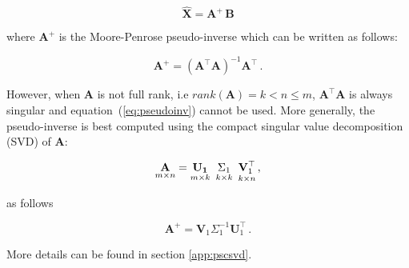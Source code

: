 \begin{equation}
\label{eq:MP}
\hat{\mathbf{X}}=\mathbf{A}^{\!\!+}\,\mathbf{B}
\end{equation}

\noindent where $\mathbf{A}^{\!\!+}$ is the Moore-Penrose pseudo-inverse
which can be written as follows: 

\begin{equation}
\label{eq:pseudoinv}
\mathbf{A}^{\!\!+}= (\mathbf{A}^{\!\!\top} \mathbf{A})^{-1}\mathbf{A}^{\!\!\top} \, .
\end{equation}

However, when $\mathbf{A}$ is not full rank, i.e
$rank(\mathbf{A})=k <  n \leq m$, $\mathbf{A}^\top \mathbf{A}$ is
always singular and equation~(\ref{eq:pseudoinv}) cannot be used.
More generally, the pseudo-inverse is best computed using the compact
singular value decomposition (SVD) of $\mathbf{A}$:

\begin{equation}
    \label{eq:compactsvd}
    \underset{m \times n}{\mathbf{A}}=
    \underset{m \times k}{\mathbf{U_1}} \enskip
    \underset{k \times k}{\Sigma_1} \enskip
    \underset{k \times n}{\mathbf{V}_1^{\top}} \, ,
\end{equation}

\noindent as follows

\begin{equation}
\label{eq:pseudoinversesvd}
\mathbf{A}^{\!\!+} = \mathbf{V}_1 \Sigma_1^{-1} \mathbf{U}_1^\top \, .
\end{equation}

More details can be found in section \ref{app:pscsvd}.



